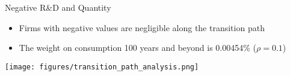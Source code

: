 \documentclass[
  10pt,               %
  aspectratio=169,     %
]{beamer}
\theoremstyle{plain}
\begin{document}
\begin{frame}{Negative R\&D and Quantity}
  \begin{itemize}
  \item Firms with negative values are negligible along the transition path
  \item The weight on consumption 100 years and beyond is 0.00454\% ($\rho=0.1$)
  \end{itemize}
  \begin{center}
    \texttt{[image: figures/transition\_path\_analysis.png]}
  \end{center}
\end{frame}



\end{document}
